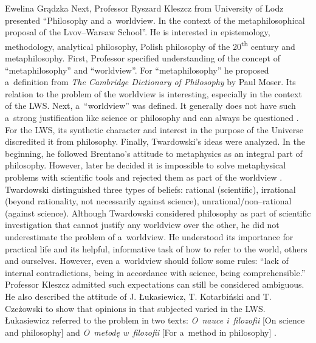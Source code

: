\begin{editorialeng}{Ewelina Grądzka}
Next, Professor Ryszard Kleszcz from University of Lodz presented ``Philosophy and a~worldview. In the context of the metaphilosophical proposal of the Lvov--Warsaw School''. He is interested in epistemology, methodology, analytical philosophy, Polish philosophy of the 20\textsuperscript{th} century and metaphilosophy. First, Professor specified understanding of the concept of ``metaphilosophy'' and ``worldview''. For ``metaphilosophy'' he proposed a~definition from \textit{The Cambridge Dictionary of Philosophy} by Paul Moser. Its relation to the problem of the worldview is interesting, especially in the context of the LWS. Next, a~``worldview'' was defined. It generally does not have such a~strong justification like science or philosophy and can always be questioned
\parencite[cf.][]{bochenski_logika_2016}. %
 For the LWS, its synthetic character and interest in the purpose of the Universe discredited it from philosophy. Finally, Twardowski’s ideas were analyzed. In the beginning, he followed Brentano’s attitude to metaphysics as an integral part of philosophy. However, later he decided it is impossible to solve metaphysical problems with scientific tools and rejected them as part of the worldview 
\parencite[cf.][]{twardowski_przemowienie_1965}. %
 Twardowski distinguished three types of beliefs: rational (scientific), irrational (beyond rationality, not necessarily against science), unrational/non--rational (against science). Although Twardowski considered philosophy as part of scientific investigation that cannot justify any worldview over the other, he did not underestimate the problem of a~worldview. He understood its importance for practical life and its helpful, informative task of how to refer to the world, others and ourselves. However, even a~worldview should follow some rules: ``lack of internal contradictions, being in accordance with science, being comprehensible.'' Professor Kleszcz admitted such expectations can still be considered ambiguous. He also described the attitude of J. Łukasiewicz, T. Kotarbiński and T. Czeżowski to show that opinions in that subjected varied in the LWS. Łukasiewicz referred to the problem in two texts: \textit{O~nauce i~filozofii} [On science and philosophy] 
\parencite*[][]{lukasiewicz_o_1915} %
 and \textit{O~metodę w~filozofii} [For a~method in philosophy] 
\parencite*[][]{lukasiewicz_o_1927}. %

\end{editorialeng}
